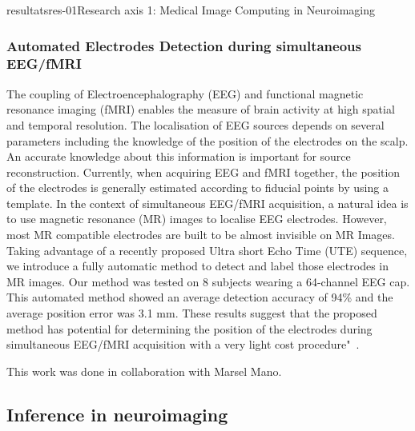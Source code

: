 \documentclass{ra2018}
\begin{document}
\begin{module}{resultats}{res-01}{Research axis 1: Medical Image Computing in Neuroimaging}
\subsubsection{Automated Electrodes Detection during simultaneous EEG/fMRI}
\begin{participants}
\end{participants}
The coupling of Electroencephalography (EEG) and functional magnetic resonance imaging (fMRI) enables the measure of brain activity at high spatial and temporal resolution. The localisation of EEG sources depends on several parameters including the knowledge of the position of the electrodes on the scalp. An accurate knowledge about this information is important for source reconstruction. Currently, when acquiring EEG and fMRI together, the position of the electrodes is generally estimated according to fiducial points by using a template. In the context of simultaneous EEG/fMRI acquisition, a natural idea is to use magnetic resonance (MR) images to localise EEG electrodes. However, most MR compatible electrodes are built to be almost invisible on MR Images. Taking advantage of a recently proposed Ultra short Echo Time (UTE) sequence, we introduce a fully automatic method to detect and label those electrodes in MR images. Our method was tested on 8 subjects wearing a 64-channel EEG cap. This automated method showed an average detection accuracy of 94\% and the average position error was 3.1 mm. These results suggest that the proposed method has potential for determining the position of the electrodes during simultaneous EEG/fMRI acquisition with a very light cost procedure"~\cite{fleury:hal-01939735, fleury:hal-01874815, mano:inserm-01577442}.

This work was done in collaboration with Marsel Mano.

\subsection{Inference in neuroimaging}

\end{module}
\end{document}
